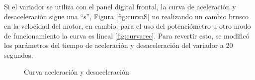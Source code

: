 Si el variador se utiliza con el panel digital frontal, la curva de aceleración y desaceleración
sigue una “s”, Figura \ref{fig:curvaS} no realizando un cambio brusco en la velocidad del motor, en cambio, para
el uso del potenciómetro u otro modo de funcionamiento la curva es lineal \ref{fig:curvarec}. Para revertir
esto, se modificó los parámetros del tiempo de aceleración y desaceleración del variador a 20 segundos.  


\begin{figure}[H]
	\centering
	\caption{Curva aceleración y desaceleración} \label{fig:curva}
\end{figure}




\newpage